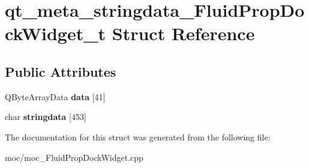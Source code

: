 \hypertarget{structqt__meta__stringdata___fluid_prop_dock_widget__t}{\section{qt\-\_\-meta\-\_\-stringdata\-\_\-\-Fluid\-Prop\-Dock\-Widget\-\_\-t Struct Reference}
\label{structqt__meta__stringdata___fluid_prop_dock_widget__t}
}
\subsection*{Public Attributes}
\begin{DoxyCompactItemize}
\item 
\hypertarget{structqt__meta__stringdata___fluid_prop_dock_widget__t_a4ec27da0a498540f17a8b4012ba7010a}{Q\-Byte\-Array\-Data {\bfseries data} \mbox{[}41\mbox{]}}\label{structqt__meta__stringdata___fluid_prop_dock_widget__t_a4ec27da0a498540f17a8b4012ba7010a}

\item 
\hypertarget{structqt__meta__stringdata___fluid_prop_dock_widget__t_a853bb9fbb11a9682d7c74ce25980bf6c}{char {\bfseries stringdata} \mbox{[}453\mbox{]}}\label{structqt__meta__stringdata___fluid_prop_dock_widget__t_a853bb9fbb11a9682d7c74ce25980bf6c}

\end{DoxyCompactItemize}


The documentation for this struct was generated from the following file\-:\begin{DoxyCompactItemize}
\item 
moc/moc\-\_\-\-Fluid\-Prop\-Dock\-Widget.\-cpp\end{DoxyCompactItemize}
